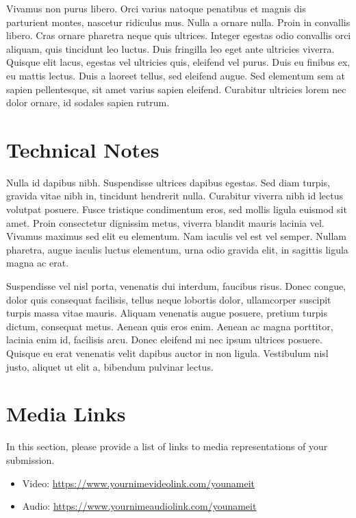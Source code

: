 \documentclass[acmsmall]{nimeart}
\begin{document}
Vivamus non purus libero. Orci varius natoque penatibus et magnis dis parturient montes, nascetur ridiculus mus. Nulla a ornare nulla. Proin in convallis libero. Cras ornare pharetra neque quis ultrices. Integer egestas odio convallis orci aliquam, quis tincidunt leo luctus. Duis fringilla leo eget ante ultricies viverra. Quisque elit lacus, egestas vel ultricies quis, eleifend vel purus. Duis eu finibus ex, eu mattis lectus. Duis a laoreet tellus, sed eleifend augue. Sed elementum sem at sapien pellentesque, sit amet varius sapien eleifend. Curabitur ultricies lorem nec dolor ornare, id sodales sapien rutrum.

\section{Technical Notes}

Nulla id dapibus nibh. Suspendisse ultrices dapibus egestas. Sed diam turpis, gravida vitae nibh in, tincidunt hendrerit nulla. Curabitur viverra nibh id lectus volutpat posuere. Fusce tristique condimentum eros, sed mollis ligula euismod sit amet. Proin consectetur dignissim metus, viverra blandit mauris lacinia vel. Vivamus maximus sed elit eu elementum. Nam iaculis vel est vel semper. Nullam pharetra, augue iaculis luctus elementum, urna odio gravida elit, in sagittis ligula magna ac erat.

Suspendisse vel nisl porta, venenatis dui interdum, faucibus risus. Donec congue, dolor quis consequat facilisis, tellus neque lobortis dolor, ullamcorper suscipit turpis massa vitae mauris. Aliquam venenatis augue posuere, pretium turpis dictum, consequat metus. Aenean quis eros enim. Aenean ac magna porttitor, lacinia enim id, facilisis arcu. Donec eleifend mi nec ipsum ultrices posuere. Quisque eu erat venenatis velit dapibus auctor in non ligula. Vestibulum nisl justo, aliquet ut elit a, bibendum pulvinar lectus.

\section{Media Links}

In this section, please provide a list of links to media representations of your submission.

\begin{itemize}
	\item Video: \url{https://www.yournimevideolink.com/younameit}
	\item Audio: \url{https://www.yournimeaudiolink.com/younameit}
\end{itemize}
\end{document}
